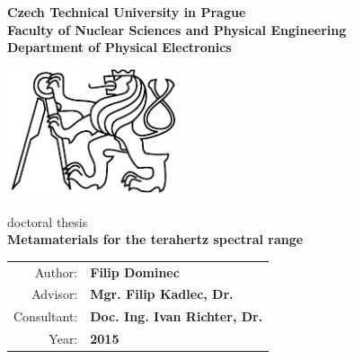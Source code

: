 
\begin{center}
\textbf{
Czech Technical University in Prague\\
Faculty of Nuclear Sciences and Physical Engineering\\ 
Department of Physical Electronics\\
 }
 \vspace{1cm}

\includegraphics[width=5cm]{img/LogoCVUT}
\vspace{4cm}

\large{doctoral thesis}\\
\vspace{5mm}
\textbf{\huge Metamaterials for the terahertz spectral range\\}
\end{center}

\date{ } 			
 
 \vfill
 \begin{tabular}{rl}
  Author: 	&\textbf{Filip Dominec}\\
  Advisor: 	&\textbf{Mgr. Filip Kadlec, Dr.}\\
  Consultant: 	&\textbf{Doc. Ing. Ivan Richter, Dr.}\\ 
  Year:		&\textbf{2015}\\
  \end{tabular}

\thispagestyle{empty}

